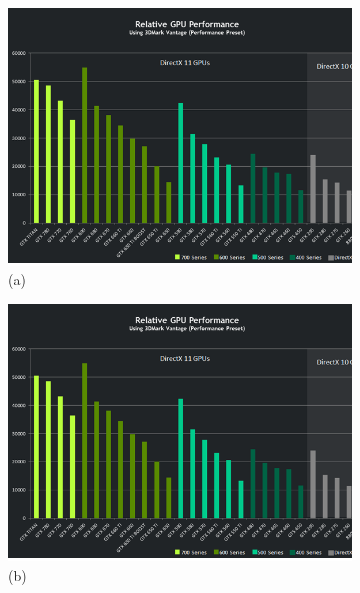 \documentclass{sig-alternate}
\begin{document}
\begin{figure}[t!]
  \centering
  \begin{subfigure}[b]{0.2\linewidth}
    \includegraphics[width=\linewidth]{Performance.png}
    \caption{(a)}
  \end{subfigure}
  \begin{subfigure}[b]{0.2\linewidth}
    \includegraphics[width=\linewidth]{Performance.png}
    \caption{(b)}
  \end{subfigure}
  \begin{subfigure}[b]{0.2\linewidth}

\end{subfigure}
\end{figure}
\end{document}
